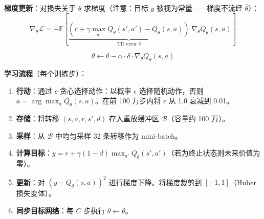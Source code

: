 \textbf{梯度更新}：对损失关于 $\theta$ 求梯度（注意：目标 $y$ 被视为常量——梯度不流经 $\bar{\theta}$）：
\begin{equation}
\nabla_\theta \mathcal{L} = -\mathbb{E}\!\left[\underbrace{\left(r + \gamma \max_{a'} Q_{\bar{\theta}}(s', a') - Q_\theta(s, a)\right)}_{\text{TD error } \delta}\; \nabla_\theta Q_\theta(s, a)\right]
\end{equation}

\begin{equation}
\theta \leftarrow \theta - \alpha \cdot \delta \cdot \nabla_\theta Q_\theta(s, a)
\end{equation}

\textbf{学习流程}（每个训练步）：

\begin{enumerate}
  \item \textbf{行动}：通过 $\epsilon$-贪心选择动作：以概率 $\epsilon$ 选择随机动作，否则 $a = \arg\max_a Q_\theta(s, a)$。在前 100 万步内将 $\epsilon$ 从 1.0 衰减到 0.01。
  \item \textbf{存储}：将转移 $(s, a, r, s', d)$ 存入重放缓冲区 $\mathcal{B}$（容量约 100 万）。
  \item \textbf{采样}：从 $\mathcal{B}$ 中均匀采样 32 条转移作为 mini-batch。
  \item \textbf{计算目标}：$y = r + \gamma(1 - d)\max_{a'} Q_{\bar{\theta}}(s', a')$（若为终止状态则未来价值为零）。
  \item \textbf{更新}：对 $(y - Q_\theta(s,a))^2$ 进行梯度下降。将梯度裁剪到 $[-1, 1]$（Huber 损失变体）。
  \item \textbf{同步目标网络}：每 $C$ 步执行 $\bar{\theta} \leftarrow \theta$。
\end{enumerate}

